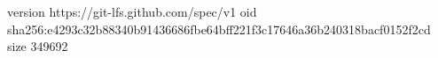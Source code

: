 version https://git-lfs.github.com/spec/v1
oid sha256:e4293c32b88340b91436686fbe64bff221f3c17646a36b240318bacf0152f2cd
size 349692
